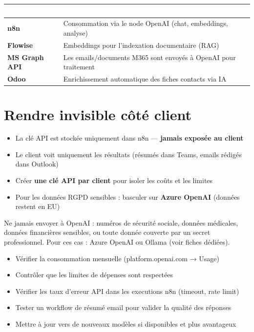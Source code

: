 \documentclass[11pt, a4paper]{article}
\begin{document}
\begin{center}
\renewcommand{\arraystretch}{1.4}
\begin{tabularx}{\linewidth}{>{\bfseries}p{2.8cm} X}
\toprule
\rowcolor{tabheader}
\textcolor{white}{\textbf{Outil}} & \textcolor{white}{\textbf{Rôle d'OpenAI API}} \\
\midrule
n8n & Consommation via le node OpenAI (chat, embeddings, analyse) \\
\rowcolor{rowgray}
Flowise & Embeddings pour l'indexation documentaire (RAG) \\
MS Graph API & Les emails/documents M365 sont envoyés à OpenAI pour traitement \\
\rowcolor{rowgray}
Odoo & Enrichissement automatique des fiches contacts via IA \\
\bottomrule
\end{tabularx}
\end{center}

\section{Rendre invisible côté client}

\begin{itemize}
  \item La clé API est stockée uniquement dans n8n — \textbf{jamais exposée au client}
  \item Le client voit uniquement les résultats (résumés dans Teams, emails rédigés dans Outlook)
  \item Créer \textbf{une clé API par client} pour isoler les coûts et les limites
  \item Pour les données RGPD sensibles : basculer sur \textbf{Azure OpenAI} (données restent en EU)
\end{itemize}

\begin{attention}
  Ne jamais envoyer à OpenAI : numéros de sécurité sociale, données médicales, données financières sensibles, ou toute donnée couverte par un secret professionnel. Pour ces cas : Azure OpenAI ou Ollama (voir fiches dédiées).
\end{attention}

\begin{checklist}
  \begin{itemize}
    \item[$\square$] Vérifier la consommation mensuelle (platform.openai.com → Usage)
    \item[$\square$] Contrôler que les limites de dépenses sont respectées
    \item[$\square$] Vérifier les taux d'erreur API dans les executions n8n (timeout, rate limit)
    \item[$\square$] Tester un workflow de résumé email pour valider la qualité des réponses
    \item[$\square$] Mettre à jour vers de nouveaux modèles si disponibles et plus avantageux
  \end{itemize}
\end{checklist}
\end{document}
